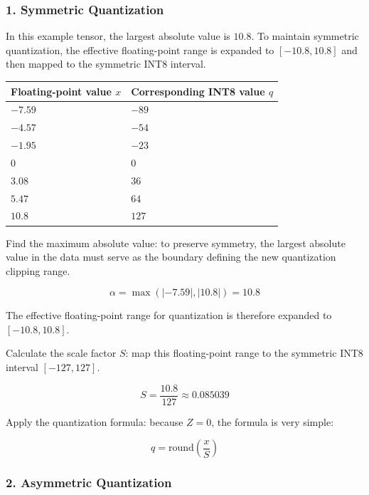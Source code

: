 \hypertarget{symmetric-quantization}{%
\subsubsection{1. Symmetric Quantization}\label{symmetric-quantization}}

In this example tensor, the largest absolute value is \(10.8\). To maintain symmetric quantization, the effective floating-point range is expanded to \([-10.8, 10.8]\) and then mapped to the symmetric INT8 interval.

\begin{longtable}[]{@{}
  >{\raggedleft\arraybackslash}p{}
  >{\raggedleft\arraybackslash}p{}@{}}
\toprule
Floating-point value \(x\) & Corresponding INT8 value \(q\) \\
\midrule
\endhead
\(-7.59\) & \(-89\) \\
\(-4.57\) & \(-54\) \\
\(-1.95\) & \(-23\) \\
\(0\) & \(0\) \\
\(3.08\) & \(36\) \\
\(5.47\) & \(64\) \\
\(10.8\) & \(127\) \\
\bottomrule
\end{longtable}

Find the maximum absolute value: to preserve symmetry, the largest absolute value in the data must serve as the boundary defining the new quantization clipping range.

\[
\alpha = \max(|-7.59|, |10.8|) = 10.8
\]

The effective floating-point range for quantization is therefore expanded to \([-10.8, 10.8]\).

Calculate the scale factor \(S\): map this floating-point range to the symmetric INT8 interval \([-127, 127]\).

\[
S = \frac{10.8}{127} \approx 0.085039
\]

Apply the quantization formula: because \(Z = 0\), the formula is very simple:

\[
q = \mathrm{round}\left(\frac{x}{S}\right)
\]

\hypertarget{asymmetric-quantization}{%
\subsubsection{2. Asymmetric Quantization}\label{asymmetric-quantization}}


